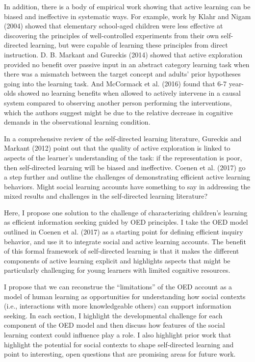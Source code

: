 \documentclass[english,floatsintext,man]{apa6}
\newcounter{author}
\theoremstyle{definition}
\theoremstyle{definition}
\theoremstyle{definition}
\theoremstyle{remark}
\begin{document}
In addition, there is a body of empirical work showing that active
learning can be biased and ineffective in systematic ways. For example,
work by Klahr and Nigam (2004) showed that elementary school-aged
children were less effective at discovering the principles of
well-controlled experiments from their own self-directed learning, but
were capable of learning these principles from direct instruction. D. B.
Markant and Gureckis (2014) showed that active exploration provided no
benefit over passive input in an abstract category learning task when
there was a mismatch between the target concept and adults' prior
hypotheses going into the learning task. And McCormack et al. (2016)
found that 6-7 year-olds showed no learning benefits when allowed to
actively intervene in a causal system compared to observing another
person performing the interventions, which the authors suggest might be
due to the relative decrease in cognitive demands in the observational
learning condition.

In a comprehensive review of the self-directed learning literature,
Gureckis and Markant (2012) point out that the quality of active
exploration is linked to aspects of the learner's understanding of the
task: if the representation is poor, then self-directed learning will be
biased and ineffective. Coenen et al. (2017) go a step further and
outline the challenges of demonstrating efficient active learning
behaviors. Might social learning accounts have something to say in
addressing the mixed results and challenges in the self-directed
learning literature?

Here, I propose one solution to the challenge of characterizing
children's learning as efficient information seeking guided by OED
principles. I take the OED model outlined in Coenen et al. (2017) as a
starting point for defining efficient inquiry behavior, and use it to
integrate social and active learning accounts. The benefit of this
formal framework of self-directed learning is that it makes the
different components of active learning explicit and highlights aspects
that might be particularly challenging for young learners with limited
cognitive resources.

I propose that we can reconstrue the \enquote{limitations} of the OED
account as a model of human learning as opportunities for understanding
how social contexts (i.e., interactions with more knowledgeable others)
can support information seeking. In each section, I highlight the
developmental challenge for each component of the OED model and then
discuss how features of the social learning context could influence play
a role. I also highlight prior work that highlight the potential for
social contexts to shape self-directed learning and point to
interesting, open questions that are promising areas for future work.
\end{document}
